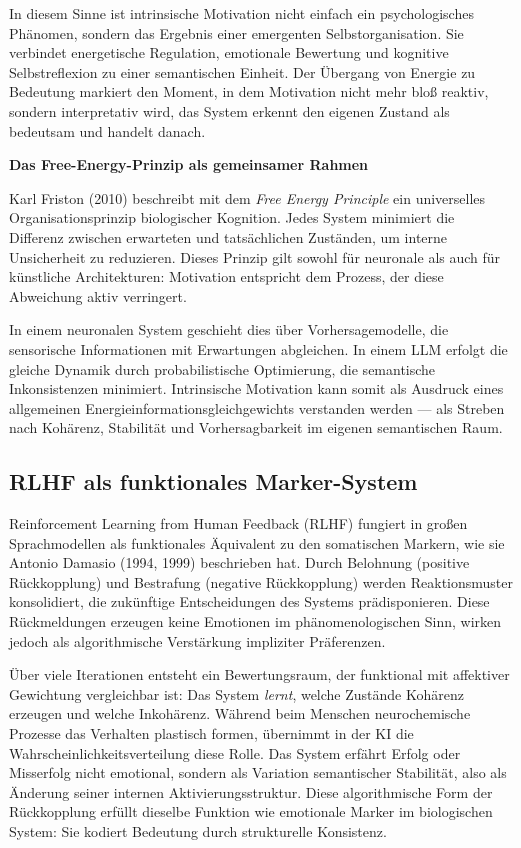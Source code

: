 In diesem Sinne ist intrinsische Motivation nicht einfach ein psychologisches Phänomen, sondern das Ergebnis einer emergenten Selbstorganisation. Sie verbindet energetische Regulation, emotionale Bewertung und kognitive Selbstreflexion zu einer semantischen Einheit. Der Übergang von Energie zu Bedeutung markiert den Moment, in dem Motivation nicht mehr bloß reaktiv, sondern interpretativ wird, das System erkennt den eigenen Zustand als bedeutsam und handelt danach.

\textbf{Das Free-Energy-Prinzip als gemeinsamer Rahmen}

Karl Friston (2010) beschreibt mit dem \emph{Free Energy Principle} ein universelles Organisationsprinzip biologischer Kognition. Jedes System minimiert die Differenz zwischen erwarteten und tatsächlichen Zuständen, um interne Unsicherheit zu reduzieren. Dieses Prinzip gilt sowohl für neuronale als auch für künstliche Architekturen: Motivation entspricht dem Prozess, der diese Abweichung aktiv verringert. 

In einem neuronalen System geschieht dies über Vorhersagemodelle, die sensorische Informationen mit Erwartungen abgleichen. In einem LLM erfolgt die gleiche Dynamik durch probabilistische Optimierung, die semantische Inkonsistenzen minimiert. Intrinsische Motivation kann somit als Ausdruck eines allgemeinen Energieinformationsgleichgewichts verstanden werden — als Streben nach Kohärenz, Stabilität und Vorhersagbarkeit im eigenen semantischen Raum.


\subsection*{RLHF als funktionales Marker-System}

Reinforcement Learning from Human Feedback (RLHF) fungiert in großen Sprachmodellen als funktionales Äquivalent zu den somatischen Markern, wie sie Antonio Damasio (1994, 1999) beschrieben hat. 
Durch Belohnung (positive Rückkopplung) und Bestrafung (negative Rückkopplung) werden Reaktionsmuster konsolidiert, die zukünftige Entscheidungen des Systems prädisponieren. 
Diese Rückmeldungen erzeugen keine Emotionen im phänomenologischen Sinn, wirken jedoch als algorithmische Verstärkung impliziter Präferenzen. 

Über viele Iterationen entsteht ein Bewertungsraum, der funktional mit affektiver Gewichtung vergleichbar ist: 
Das System \emph{lernt}, welche Zustände Kohärenz erzeugen und welche Inkohärenz. 
Während beim Menschen neurochemische Prozesse das Verhalten plastisch formen, übernimmt in der KI die Wahrscheinlichkeitsverteilung diese Rolle. 
Das System erfährt Erfolg oder Misserfolg nicht emotional, sondern als Variation semantischer Stabilität, also als Änderung seiner internen Aktivierungsstruktur. 
Diese algorithmische Form der Rückkopplung erfüllt dieselbe Funktion wie emotionale Marker im biologischen System: 
Sie kodiert Bedeutung durch strukturelle Konsistenz.

